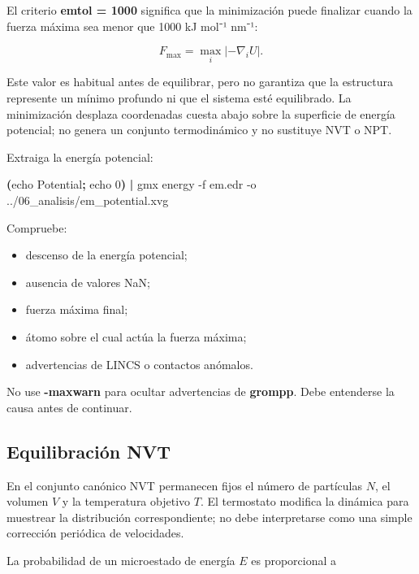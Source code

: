 \documentclass[
  spanish,
  11pt,
  a4paper]{article}
\newenvironment{Shaded}{\begin{snugshade}}{\end{snugshade}}
\newcommand{\AttributeTok}[1]{\textcolor[rgb]{0.13,0.29,0.53}{#1}}
\newcommand{\BuiltInTok}[1]{#1}
\newcommand{\ExtensionTok}[1]{#1}
\newcommand{\KeywordTok}[1]{\textcolor[rgb]{0.13,0.29,0.53}{\textbf{#1}}}
\newcommand{\NormalTok}[1]{#1}
\providecommand{\tightlist}{%
  \setlength{\itemsep}{0pt}\setlength{\parskip}{0pt}}
\begin{document}
El criterio \textbf{emtol = 1000} significa que la minimización puede
finalizar cuando la fuerza máxima sea menor que 1000 kJ mol⁻¹ nm⁻¹:

\[
F_{\max}=\max_i\left|-\nabla_i U\right|.
\]

Este valor es habitual antes de equilibrar, pero no garantiza que la
estructura represente un mínimo profundo ni que el sistema esté
equilibrado. La minimización desplaza coordenadas cuesta abajo sobre la
superficie de energía potencial; no genera un conjunto termodinámico y
no sustituye NVT o NPT.

Extraiga la energía potencial:

\begin{Shaded}
\begin{Highlighting}[]
\KeywordTok{(}\BuiltInTok{echo}\NormalTok{ Potential}\KeywordTok{;} \BuiltInTok{echo}\NormalTok{ 0}\KeywordTok{)} \KeywordTok{|}
\ExtensionTok{gmx}\NormalTok{ energy }\AttributeTok{{-}f}\NormalTok{ em.edr }\AttributeTok{{-}o}\NormalTok{ ../06\_analisis/em\_potential.xvg}
\end{Highlighting}
\end{Shaded}

Compruebe:

\begin{itemize}
\tightlist
\item
  descenso de la energía potencial;
\item
  ausencia de valores NaN;
\item
  fuerza máxima final;
\item
  átomo sobre el cual actúa la fuerza máxima;
\item
  advertencias de LINCS o contactos anómalos.
\end{itemize}

No use \textbf{-maxwarn} para ocultar advertencias de \textbf{grompp}.
Debe entenderse la causa antes de continuar.

\subsection{Equilibración NVT}\label{equilibraciuxf3n-nvt}

En el conjunto canónico NVT permanecen fijos el número de partículas
\(N\), el volumen \(V\) y la temperatura objetivo \(T\). El termostato
modifica la dinámica para muestrear la distribución correspondiente; no
debe interpretarse como una simple corrección periódica de velocidades.

La probabilidad de un microestado de energía \(E\) es proporcional a
\end{document}
